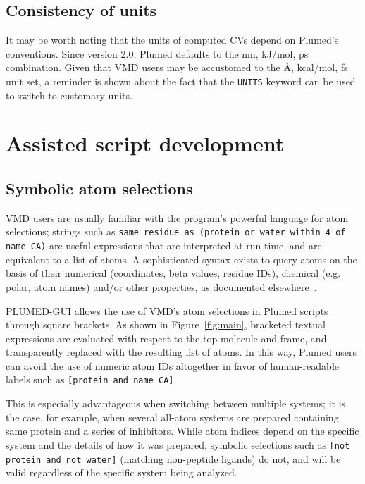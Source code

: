 \documentclass[preprint,12pt]{elsarticle}
\begin{document}


\subsection{Consistency of units}

It may be worth noting that the units of computed CVs  depend on
Plumed's conventions.  Since version 2.0, Plumed defaults to the nm,
kJ/mol, ps combination. Given that VMD users may be accustomed to the
\AA, kcal/mol, fs unit set, a reminder is shown about the fact that
the \texttt{UNITS} keyword can be used to  switch to customary
units.



\section{Assisted script development}


\subsection{Symbolic atom selections}\label{sec:symb-atom-select}

VMD users are usually familiar with the program's powerful language for atom
selections; strings such as \texttt{same residue as (protein or water
  within 4 of name CA)} are useful expressions that are interpreted at
run time, and are equivalent to a list of atoms.  A sophisticated syntax
 exists to query atoms on the basis of their numerical
(coordinates, beta values, residue IDs), chemical (e.g. polar, atom
names) and/or other properties, as documented
elsewhere~\cite{Humphrey_Dalke_Schulten_1996}.

PLUMED-GUI allows the use of VMD's atom selections in Plumed scripts
through  square brackets. As shown in Figure~\ref{fig:main},
bracketed textual expressions  are evaluated with respect to
the top molecule and frame, and transparently replaced with the
resulting list of atoms. In this way, Plumed users can 
avoid the use of numeric atom IDs altogether in favor of human-readable
labels such as \texttt{[protein and name CA]}.

This is especially advantageous when switching between multiple
systems; it is the case, for example, when several all-atom systems
are prepared containing same protein and a series of inhibitors.
While atom indices depend on the specific system and the details of
how it was prepared, symbolic selections such as \texttt{[not protein
  and not water]} (matching non-peptide ligands) do not, and will be
valid regardless of the specific system being analyzed.
\end{document}
